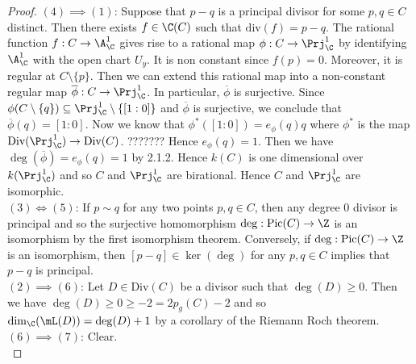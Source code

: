 \documentclass[a4paper]{article}
\begin{document}
\begin{prp}{}{}
\begin{proof}
$(4)\implies(1)$: Suppose that $p-q$ is a principal divisor for some $p,q\in C$ distinct. Then there exists $f\in\C(C)$ such that $\text{div}(f)=p-q$. The rational function $f:C\to\A_\C^1$ gives rise to a rational map $\phi:C\to\Prj_\C^1$ by identifying $\A_\C^1$ with the open chart $U_y$. It is non constant since $f(p)=0$. Moreover, it is regular at $C\setminus\{p\}$. Then we can extend this rational map into a non-constant regular map $\overline{\phi}:C\to\Prj_\C^1$. In particular, $\overline{\phi}$ is surjective. Since $\phi(C\setminus\{q\})\subseteq\Prj_\C^1\setminus\{[1:0]\}$ and $\overline{\phi}$ is surjective, we conclude that $\overline{\phi}(q)=[1:0]$. Now we know that $\phi^\ast([1:0])=e_\phi(q)q$ where $\phi^\ast$ is the map $\text{Div}(\Prj_\C^1)\to\text{Div}(C)$. ??????? Hence $e_\phi(q)=1$. Then we have $\deg(\overline{\phi})=e_\phi(q)=1$ by 2.1.2. Hence $k(C)$ is one dimensional over $k(\Prj_\C^1)$ and so $C$ and $\Prj_\C^1$ are birational. Hence $C$ and $\Prj_\C^1$ are isomorphic. \\

$(3)\iff(5)$: If $p\sim q$ for any two points $p,q\in C$, then any degree $0$ divisor is principal and so the surjective homomorphism $\deg:\text{Pic}(C)\to\Z$ is an isomorphism by the first isomorphism theorem. Conversely, if $\deg:\text{Pic}(C)\to\Z$ is an isomorphism, then $[p-q]\in\ker(\deg)$ for any $p,q\in C$ implies that $p-q$ is principal. \\

$(2)\implies(6)$: Let $D\in\text{Div}(C)$ be a divisor such that $\deg(D)\geq 0$. Then we have $\deg(D)\geq 0\geq -2=2p_g(C)-2$ and so $\dim_\C(\mL(D))=\deg(D)+1$ by a corollary of the Riemann Roch theorem. \\

$(6)\implies(7)$: Clear. \\


\end{proof}
\end{prp}
\end{document}
